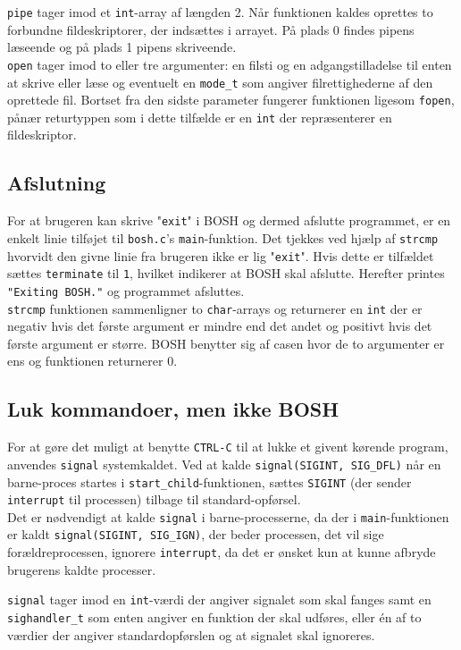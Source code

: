 \texttt{pipe} tager imod et \texttt{int}-array af længden 2. Når funktionen kaldes oprettes to forbundne fildeskriptorer, der indsættes i arrayet. På plads 0 findes pipens læseende og på plads 1 pipens skriveende.\\

\texttt{open} tager imod to eller tre argumenter: en filsti og en adgangstilladelse til enten at skrive eller læse og eventuelt en \texttt{mode\_t} som angiver filrettighederne af den oprettede fil. Bortset fra den sidste parameter fungerer funktionen ligesom \texttt{fopen}, pånær returtyppen som i dette tilfælde er en \texttt{int} der repræsenterer en fildeskriptor.

\subsection{Afslutning}
For at brugeren kan skrive "\texttt{exit}" i BOSH og dermed afslutte programmet, er en enkelt linie tilføjet til \texttt{bosh.c}'s \texttt{main}-funktion. Det tjekkes ved hjælp af \texttt{strcmp} hvorvidt den givne linie fra brugeren ikke er lig "\texttt{exit}". Hvis dette er tilfældet sættes \texttt{terminate} til \texttt{1}, hvilket indikerer at BOSH skal afslutte. Herefter printes \texttt{"Exiting BOSH."} og programmet afsluttes. \\

\texttt{strcmp} funktionen sammenligner to \texttt{char}-arrays og returnerer en \texttt{int} der er negativ hvis det første argument er mindre end det andet og positivt hvis det første argument er større. BOSH benytter sig af casen hvor de to argumenter er ens og funktionen returnerer 0.

\subsection{Luk kommandoer, men ikke BOSH}
For at gøre det muligt at benytte \texttt{CTRL-C} til at lukke et givent kørende program, anvendes \texttt{signal} systemkaldet. Ved at kalde \texttt{signal(SIGINT, SIG\_DFL)} når en barne-proces startes i \texttt{start\_child}-funktionen, sættes \texttt{SIGINT} (der sender \texttt{interrupt} til processen) tilbage til standard-opførsel.\\

Det er nødvendigt at kalde \texttt{signal} i barne-processerne, da der i \texttt{main}-funktionen er kaldt \texttt{signal(SIGINT, SIG\_IGN)}, der beder processen, det vil sige forældreprocessen, ignorere \texttt{interrupt}, da det er ønsket kun at kunne afbryde brugerens kaldte processer. 

\texttt{signal} tager imod en \texttt{int}-værdi der angiver signalet som skal fanges samt en \texttt{sighandler\_t} som enten angiver en funktion der skal udføres, eller én af to værdier der angiver standardopførslen og at signalet skal ignoreres.